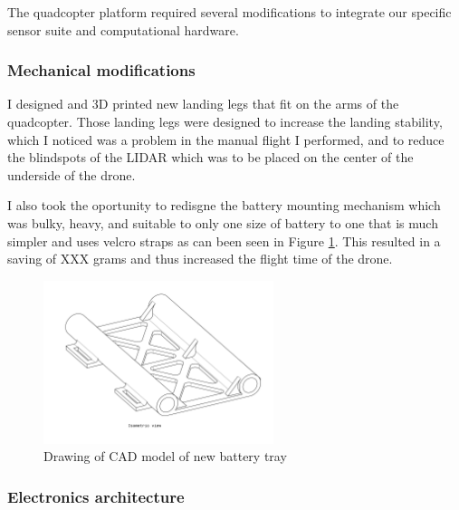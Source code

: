 \documentclass[11pt]{article}
\begin{document}
            The quadcopter platform required several modifications to integrate our specific sensor suite and computational hardware.

            \subsubsection{Mechanical modifications}

                I designed and 3D printed new landing legs that fit on the arms of the quadcopter. Those landing legs were designed to increase the landing stability, which I noticed was a problem in the manual flight I performed, and to reduce the blindspots of the LIDAR which was to be placed on the center of the underside of the drone.

                I also took the oportunity to redisgne the battery mounting mechanism which was bulky, heavy, and suitable to only one size of battery to one that is much simpler and uses velcro straps as can been seen in Figure \ref{fig:landing_legs}. This resulted in a saving of \color{red} XXX grams \color{black} and thus increased the flight time of the drone. 
                

                \begin{figure}[H]
                    \centering
                    \includegraphics[width=0.6\textwidth]{Images/BatteryTrayDrawing.pdf}
                    \caption{Drawing of CAD model of new battery tray}
                    \label{fig:landing_legs}
                \end{figure}    
            \subsubsection{Electronics architecture}

\end{document}
